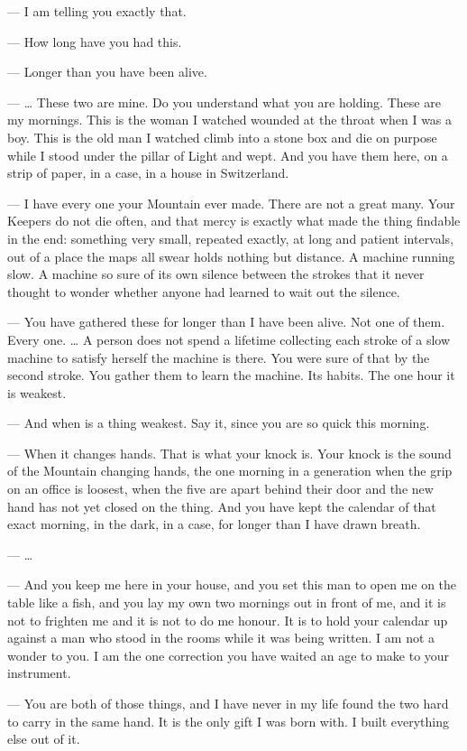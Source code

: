 \begin{room}
--- I am telling you exactly that.

--- How long have you had this.

--- Longer than you have been alive.

--- \ldots{} These two are mine. Do you understand what you are holding. These are my mornings. This is the woman I watched wounded at the throat when I was a boy. This is the old man I watched climb into a stone box and die on purpose while I stood under the pillar of Light and wept. And you have them here, on a strip of paper, in a case, in a house in Switzerland.

--- I have every one your Mountain ever made. There are not a great many. Your Keepers do not die often, and that mercy is exactly what made the thing findable in the end: something very small, repeated exactly, at long and patient intervals, out of a place the maps all swear holds nothing but distance. A machine running slow. A machine so sure of its own silence between the strokes that it never thought to wonder whether anyone had learned to wait out the silence.

--- You have gathered these for longer than I have been alive. Not one of them. Every one. \ldots{} A person does not spend a lifetime collecting each stroke of a slow machine to satisfy herself the machine is there. You were sure of that by the second stroke. You gather them to learn the machine. Its habits. The one hour it is weakest.

--- And when is a thing weakest. Say it, since you are so quick this morning.

--- When it changes hands. That is what your knock is. Your knock is the sound of the Mountain changing hands, the one morning in a generation when the grip on an office is loosest, when the five are apart behind their door and the new hand has not yet closed on the thing. And you have kept the calendar of that exact morning, in the dark, in a case, for longer than I have drawn breath.

--- \ldots{}

--- And you keep me here in your house, and you set this man to open me on the table like a fish, and you lay my own two mornings out in front of me, and it is not to frighten me and it is not to do me honour. It is to hold your calendar up against a man who stood in the rooms while it was being written. I am not a wonder to you. I am the one correction you have waited an age to make to your instrument.

--- You are both of those things, and I have never in my life found the two hard to carry in the same hand. It is the only gift I was born with. I built everything else out of it.


\end{room}
